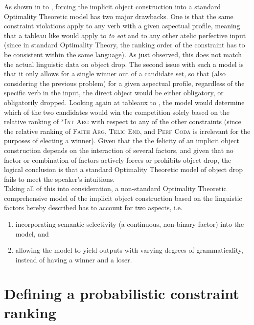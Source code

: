 As shown in  to , forcing the implicit object construction into a standard Optimality Theoretic model has two major drawbacks. One is that the same constraint violations apply to any verb with a given aspectual profile, meaning that a tableau like  would apply to \textit{to eat} and to any other atelic perfective input (since in standard Optimality Theory, the ranking order of the constraint has to be consistent within the same language). As just observed, this does not match the actual linguistic data on object drop. The second issue with such a model is that it only allows for a single winner out of a candidate set, so that (also considering the previous problem) for a given aspectual profile, regardless of the specific verb in the input, the direct object would be either obligatory, or obligatorily dropped. Looking again at tableaux  to , the model would determine which of the two candidates would win the competition solely based on the relative ranking of \textsc{*Int Arg} with respect to any of the other constraints (since the relative ranking of \textsc{Faith Arg}, \textsc{Telic End}, and \textsc{Perf Coda} is irrelevant for the purposes of electing a winner). Given that the the felicity of an implicit object construction depends on the interaction of several factors, and given that no factor or combination of factors actively forces or prohibits object drop, the logical conclusion is that a standard Optimality Theoretic model of object drop fails to meet the speaker's intuitions.\\
Taking all of this into consideration, a non-standard Optimality Theoretic comprehensive model of the implicit object construction based on the linguistic factors hereby described has to account for two aspects, i.e.
\begin{enumerate}
    \item incorporating semantic selectivity (a continuous, non-binary factor) into the model, and
    \item allowing the model to yield outputs with varying degrees of grammaticality, instead of having a winner and a loser.
\end{enumerate}

\section{Defining a probabilistic constraint ranking} 
